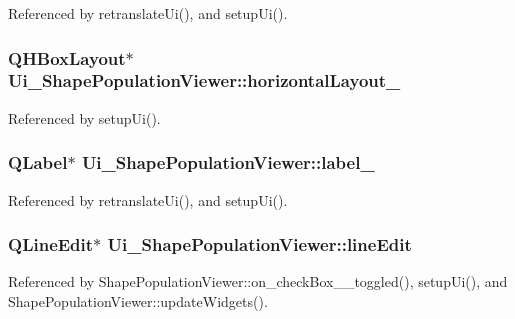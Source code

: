 Referenced by retranslate\-Ui(), and setup\-Ui().

\hypertarget{class_ui___shape_population_viewer_a9951cfa48bbeac90b3149d41bc5e9b51}{
\subsubsection[{horizontal\-Layout\-\_\-7}]{\setlength{\rightskip}{0pt plus 5cm}Q\-H\-Box\-Layout$\ast$ Ui\-\_\-\-Shape\-Population\-Viewer\-::horizontal\-Layout\-\_}}\label{class_ui___shape_population_viewer_a9951cfa48bbeac90b3149d41bc5e9b51}


Referenced by setup\-Ui().

\hypertarget{class_ui___shape_population_viewer_ab5eb96a308c04fad1070ded37dab571d}{
\subsubsection[{label\-\_\-5}]{\setlength{\rightskip}{0pt plus 5cm}Q\-Label$\ast$ Ui\-\_\-\-Shape\-Population\-Viewer\-::label\-\_}}\label{class_ui___shape_population_viewer_ab5eb96a308c04fad1070ded37dab571d}


Referenced by retranslate\-Ui(), and setup\-Ui().

\hypertarget{class_ui___shape_population_viewer_a76a73443281f9294843ac1e2e67822ce}{
\subsubsection[{line\-Edit}]{\setlength{\rightskip}{0pt plus 5cm}Q\-Line\-Edit$\ast$ Ui\-\_\-\-Shape\-Population\-Viewer\-::line\-Edit}}\label{class_ui___shape_population_viewer_a76a73443281f9294843ac1e2e67822ce}


Referenced by Shape\-Population\-Viewer\-::on\-\_\-check\-Box\-\_\-\_\-toggled(), setup\-Ui(), and Shape\-Population\-Viewer\-::update\-Widgets().

